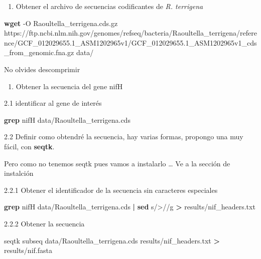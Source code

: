 \documentclass[
]{book}
\newenvironment{Shaded}{\begin{snugshade}}{\end{snugshade}}
\newcommand{\AttributeTok}[1]{\textcolor[rgb]{0.13,0.29,0.53}{#1}}
\newcommand{\ExtensionTok}[1]{#1}
\newcommand{\FunctionTok}[1]{\textcolor[rgb]{0.13,0.29,0.53}{\textbf{#1}}}
\newcommand{\KeywordTok}[1]{\textcolor[rgb]{0.13,0.29,0.53}{\textbf{#1}}}
\newcommand{\NormalTok}[1]{#1}
\newcommand{\OperatorTok}[1]{\textcolor[rgb]{0.81,0.36,0.00}{\textbf{#1}}}
\newcommand{\StringTok}[1]{\textcolor[rgb]{0.31,0.60,0.02}{#1}}
\providecommand{\tightlist}{%
  \setlength{\itemsep}{0pt}\setlength{\parskip}{0pt}}
\begin{document}
\begin{enumerate}
\def\labelenumi{\arabic{enumi}.}
\tightlist
\item
  Obtener el archivo de secuencias codificantes de \emph{R. terrigena}
\end{enumerate}

\begin{Shaded}
\begin{Highlighting}[]
\FunctionTok{wget} \AttributeTok{{-}O}\NormalTok{ Raoultella\_terrigena.cds.gz https://ftp.ncbi.nlm.nih.gov/genomes/refseq/bacteria/Raoultella\_terrigena/reference/GCF\_012029655.1\_ASM1202965v1/GCF\_012029655.1\_ASM1202965v1\_cds\_from\_genomic.fna.gz data/}
\end{Highlighting}
\end{Shaded}

No olvides descomprimir

\begin{enumerate}
\def\labelenumi{\arabic{enumi}.}
\setcounter{enumi}{1}
\tightlist
\item
  Obtener la secuencia del gene nifH
\end{enumerate}

2.1 identificar al gene de interés

\begin{Shaded}
\begin{Highlighting}[]
\FunctionTok{grep}\NormalTok{ nifH data/Raoultella\_terrigena.cds }
\end{Highlighting}
\end{Shaded}

2.2 Definir como obtendré la secuencia, hay varias formas, propongo una muy fácil, con \textbf{seqtk}.

Pero como no tenemos seqtk pues vamos a instalarlo \ldots{} Ve a la sección de instalción

2.2.1 Obtener el identificador de la secuencia sin caracteres especiales

\begin{Shaded}
\begin{Highlighting}[]
\FunctionTok{grep}\NormalTok{ nifH data/Raoultella\_terrigena.cds }\KeywordTok{|} \FunctionTok{sed} \StringTok{\textquotesingle{}s/\textgreater{}//g\textquotesingle{}} \OperatorTok{\textgreater{}}\NormalTok{ results/nif\_headers.txt}
\end{Highlighting}
\end{Shaded}

2.2.2 Obtener la secuencia

\begin{Shaded}
\begin{Highlighting}[]
\ExtensionTok{seqtk}\NormalTok{ subseq data/Raoultella\_terrigena.cds results/nif\_headers.txt }\OperatorTok{\textgreater{}}\NormalTok{ results/nif.fasta}
\end{Highlighting}
\end{Shaded}
\end{document}
